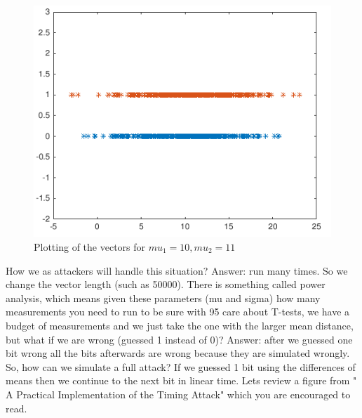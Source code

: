 \begin{figure}[!ht]
    \centering
    \includegraphics[scale=0.6]{images/chapter_3/defmatplot2.png}
    \caption{Plotting of the vectors for \(mu_1 = 10, mu_2 = 11\)} \label{fig:defmatplot2}
\end{figure}

How we as attackers will handle this situation? Answer: run many times. So we
change the vector length (such as 50000). There is something called power
analysis, which means given these parameters (mu and sigma) how many
measurements you need to run to be sure with 95%
care about T-tests, we have a budget of measurements and we just take the one
with the larger mean distance, but what if we are wrong (guessed 1 instead of
0)? Answer: after we guessed one bit wrong all the bits afterwards are wrong
because they are simulated wrongly. So, how can we simulate a full attack? If we
guessed 1 bit using the differences of means then we continue to the next bit in
linear time. Lets review  a figure from " A Practical Implementation of the
Timing Attack" which you are encouraged to read.


